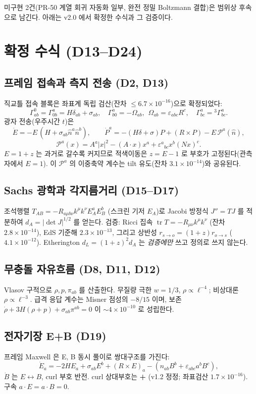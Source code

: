 \documentclass[11pt]{article}
\newcommand{\nhat}{\hat{n}}
\begin{document}
미구현 2건(PR-50 계열 회귀 자동화 일부, 완전 정밀 Boltzmann 결합)은 범위상 후속으로
남긴다. 아래는 v2.0 에서 확정한 수식과 그 검증이다.

\section{확정 수식 (D13--D24)}

\subsection{프레임 접속과 측지 전송 (D2, D13)}
직교틀 접속 블록은 좌표계 독립 검산(잔차 $\le 6.7\times10^{-16}$)으로 확정되었다:
\[
\Gamma^0_{ab}=\Gamma^a_{0b}=H\delta_{ab}+\sigma_{ab},\quad
\Gamma^a_{b0}=-\Omega_{ab},\ \ \Omega_{ab}=\varepsilon_{abc}R^c,\quad
\Gamma^a_{bc}={}^3\Gamma^a_{bc}.
\]
광자 전송(우주시간 $t$)은
\[
\dot E = -E\,(H+\sigma_{ab}\nhat^a\nhat^b),\qquad
\dot P^a = -(H\delta+\sigma)P + (R\times P) - E\,\mathcal{P}^a(\nhat),
\]
\[
\mathcal{P}^a(x)=A^a|x|^2-(A\!\cdot\!x)x^a+\varepsilon^a{}_{bc}x^b(Nx)^c .
\]
$E=1+z$ 는 과거로 갈수록 커지므로 적색이동은 $z=E-1$ 로 부호가 고정된다(관측자에서
$E=1$). 이 $\mathcal{P}^a$ 의 이중축약 계수는 tilt 유도(잔차 $3.1\times10^{-14}$)와 공유된다.

\subsection{Sachs 광학과 각지름거리 (D15--D17)}
조석행렬 $T_{AB}=-R_{a\mu b\nu}k^\mu k^\nu E_A^a E_B^b$ (스크린 기저 $E_A$)로 Jacobi
방정식 $J''=T J$ 를 적분하여 $d_A=|\det J|^{1/2}$ 를 얻는다. 검증: Ricci 집속
$\operatorname{tr}T=-R_{\mu\nu}k^\mu k^\nu$ (잔차 $2.8\times10^{-14}$), EdS 기준해
$2.3\times10^{-13}$, 그리고 상반성 $r_{s\to o}=(1+z)r_{o\to s}$ ($4.1\times10^{-12}$).
Etherington $d_L=(1+z)^2 d_A$ 는 \emph{검증에만} 쓰고 정의로 쓰지 않는다.

\subsection{무충돌 자유흐름 (D8, D11, D12)}
Vlasov 구적으로 $\rho,p,\pi_{ab}$ 를 산출한다. 무질량 극한 $w=1/3$, $\rho\propto\ell^{-4}$;
비상대론 $\rho\propto\ell^{-3}$. 급격 응답 계수는 Misner 점성의 $-8/15$ 이며, 보존
$\dot\rho+3H(\rho+p)+\sigma_{ab}\pi^{ab}=0$ 이 $\sim4\times10^{-10}$ 로 성립한다.

\subsection{전자기장 E+B (D19)}
프레임 Maxwell 은 E, B 동시 풀이로 쌍대구조를 가진다:
\[
\dot E_a=-2HE_a+\sigma_{ab}E^b+(R\times E)_a-(n_{ab}B^b+\varepsilon_{abc}a^bB^c),
\]
$\dot B$ 는 $E\!\leftrightarrow\!B$, curl 부호 반전. curl 상대부호는 \textbf{+}
(v1.2 정정; 좌표검산 $1.7\times10^{-16}$). 구속 $a\!\cdot\!E=a\!\cdot\!B=0$.
\end{document}
